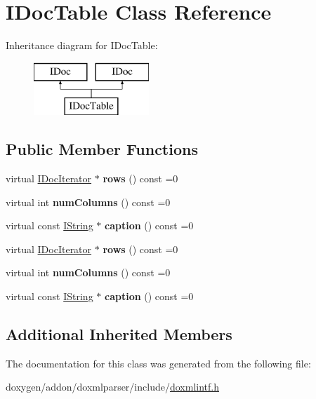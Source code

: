 \hypertarget{class_i_doc_table}{}\section{I\+Doc\+Table Class Reference}
\label{class_i_doc_table}
Inheritance diagram for I\+Doc\+Table\+:\begin{figure}[H]
\begin{center}
\leavevmode
\includegraphics[height=2.000000cm]{class_i_doc_table}
\end{center}
\end{figure}
\subsection*{Public Member Functions}
\begin{DoxyCompactItemize}
\item 
\mbox{\label{class_i_doc_table_acea9f866349900d4a3d6ea8b8275cd92}} 
virtual \mbox{\hyperlink{class_i_doc_iterator}{I\+Doc\+Iterator}} $\ast$ {\bfseries rows} () const =0
\item 
\mbox{\label{class_i_doc_table_acab0d9c79547810657687c6ef0b15291}} 
virtual int {\bfseries num\+Columns} () const =0
\item 
\mbox{\label{class_i_doc_table_acad6d38a42f9573ba2db8a997d49f9f2}} 
virtual const \mbox{\hyperlink{class_i_string}{I\+String}} $\ast$ {\bfseries caption} () const =0
\item 
\mbox{\label{class_i_doc_table_acea9f866349900d4a3d6ea8b8275cd92}} 
virtual \mbox{\hyperlink{class_i_doc_iterator}{I\+Doc\+Iterator}} $\ast$ {\bfseries rows} () const =0
\item 
\mbox{\label{class_i_doc_table_acab0d9c79547810657687c6ef0b15291}} 
virtual int {\bfseries num\+Columns} () const =0
\item 
\mbox{\label{class_i_doc_table_acad6d38a42f9573ba2db8a997d49f9f2}} 
virtual const \mbox{\hyperlink{class_i_string}{I\+String}} $\ast$ {\bfseries caption} () const =0
\end{DoxyCompactItemize}
\subsection*{Additional Inherited Members}


The documentation for this class was generated from the following file\+:\begin{DoxyCompactItemize}
\item 
doxygen/addon/doxmlparser/include/\mbox{\hyperlink{include_2doxmlintf_8h}{doxmlintf.\+h}}\end{DoxyCompactItemize}
